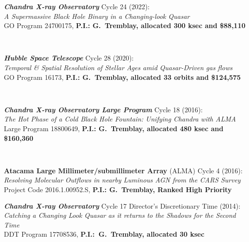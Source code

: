 \documentclass[11pt]{article}
\begin{document}
\hspace{42mm} \parbox{5.15in}{\textbf{\textit{Chandra X-ray Observatory}} Cycle 24 (2022):\\ \textit{A Supermassive Black Hole Binary in a Changing-look Quasar} \\ GO Program 24700175, \textbf{P.I.: G.~Tremblay, allocated 300 ksec and \$88,110} }\\





\vspace{4mm}

\hspace{42mm} \parbox{5.15in}{\textbf{\textit{Hubble Space Telescope}} Cycle 28 (2020):\\ \textit{Temporal \& Spatial Resolution of Stellar Ages amid Quasar-Driven gas flows} \\ GO Program 16173, \textbf{P.I.: G.~Tremblay, allocated 33 orbits and \$124,575}} \\





\vspace{4mm}

\hspace{42mm} \parbox{5.15in}{\textbf{\textit{Chandra X-ray Observatory Large Program}} Cycle 18 (2016):\\ \textit{The Hot Phase of a Cold Black Hole Fountain: Unifying Chandra with ALMA} \\ Large Program 18800649, \textbf{P.I.: G.~Tremblay, allocated 480 ksec and \$160,360} }\\




\vspace{4mm}


\hspace{42mm} \parbox{5.15in}{\textbf{Atacama Large Millimeter/submillimeter Array} (ALMA) Cycle 4 (2016):\\ \textit{ Resolving Molecular Outflows in nearby Luminous AGN from the CARS Survey} \\ Project Code 2016.1.00952.S, \textbf{P.I.: G.~Tremblay, Ranked High Priority}}

\vspace{4mm}

\hspace{42mm} \parbox{5.15in}{\textbf{\textit{Chandra X-ray Observatory}} Cycle 17 Director's Discretionary Time (2014): \\ \textit{Catching a Changing Look Quasar as it returns to the Shadows for the Second Time} \\ DDT Program 17708536, \textbf{P.I.:~G.~Tremblay, allocated 30 ksec}}\\
\end{document}
